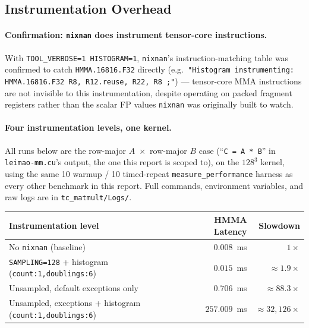 \documentclass[11pt]{article}
\begin{document}
\subsection{Instrumentation Overhead}
\label{sec:nixnan-overhead}

\paragraph{Confirmation: \texttt{nixnan} does instrument tensor-core instructions.} With
\texttt{TOOL\_VERBOSE=1 HISTOGRAM=1}, \texttt{nixnan}'s instruction-matching table was
confirmed to catch \texttt{HMMA.16816.F32} directly (e.g.\ \texttt{"Histogram
instrumenting: HMMA.16816.F32 R8, R12.reuse, R22, R8 ;"}) --- tensor-core MMA
instructions are not invisible to this instrumentation, despite operating on packed
fragment registers rather than the scalar FP values \texttt{nixnan} was originally built
to watch.

\paragraph{Four instrumentation levels, one kernel.} All runs below are the row-major
$A$~$\times$~row-major $B$ case (``\texttt{C = A * B}'' in \texttt{leimao-mm.cu}'s
output, the one this report is scoped to), on the $128^3$ kernel, using the same 10
warmup / 10 timed-repeat \texttt{measure\_performance} harness as every other benchmark
in this report. Full commands, environment variables, and raw logs are in
\texttt{tc\_matmult/Logs/}.

\begin{center}
\small
\begin{tabular}{lrr}
\toprule
Instrumentation level & HMMA Latency & Slowdown \\
\midrule
No \texttt{nixnan} (baseline) & $0.008$~ms & $1\times$ \\
\texttt{SAMPLING=128} + histogram (\texttt{count:1,doublings:6}) & $0.015$~ms & $\approx\!1.9\times$ \\
Unsampled, default exceptions only & $0.706$~ms & $\approx\!88.3\times$ \\
Unsampled, exceptions + histogram (\texttt{count:1,doublings:6}) & $257.009$~ms & $\approx\!32{,}126\times$ \\
\bottomrule
\end{tabular}
\end{center}
\end{document}
